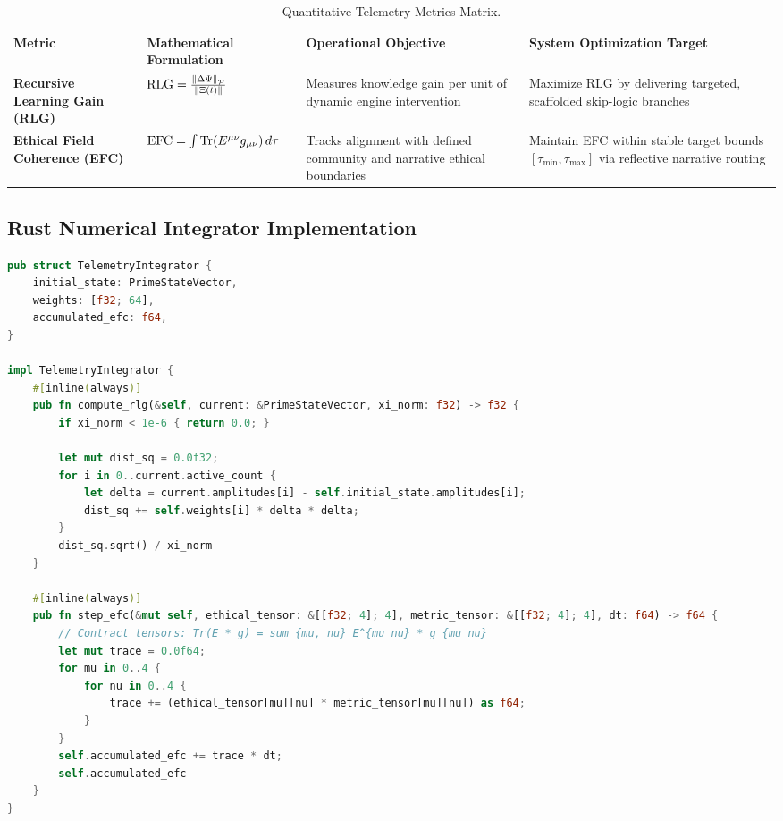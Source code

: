 \begin{table}[htbp]
\centering
\small
\begin{tabularx}{\textwidth}{l p{3.8cm} p{3.8cm} X}
\toprule
\textbf{Metric} & \textbf{Mathematical Formulation} & \textbf{Operational Objective} & \textbf{System Optimization Target} \\
\midrule
\textbf{Recursive Learning Gain (RLG)} & $\mathrm{RLG} = \frac{\norm{\Delta \Psi}_{\mathcal{P}}}{\norm{\Xi(t)}}$ & Measures knowledge gain per unit of dynamic engine intervention & Maximize RLG by delivering targeted, scaffolded skip-logic branches \\
\addlinespace
\textbf{Ethical Field Coherence (EFC)} & $\mathrm{EFC} = \int \Tr(E^{\mu\nu} g_{\mu\nu})\, d\tau$ & Tracks alignment with defined community and narrative ethical boundaries & Maintain EFC within stable target bounds $[\tau_{\min}, \tau_{\max}]$ via reflective narrative routing \\
\bottomrule
\end{tabularx}
\caption{Quantitative Telemetry Metrics Matrix.}
\label{tab:telemetry_metrics}
\end{table}

\subsection{Rust Numerical Integrator Implementation}

\begin{lstlisting}[language=Rust, caption={SIMD-Accelerated RLG and EFC Metric Integrators}]
pub struct TelemetryIntegrator {
    initial_state: PrimeStateVector,
    weights: [f32; 64],
    accumulated_efc: f64,
}

impl TelemetryIntegrator {
    #[inline(always)]
    pub fn compute_rlg(&self, current: &PrimeStateVector, xi_norm: f32) -> f32 {
        if xi_norm < 1e-6 { return 0.0; }
        
        let mut dist_sq = 0.0f32;
        for i in 0..current.active_count {
            let delta = current.amplitudes[i] - self.initial_state.amplitudes[i];
            dist_sq += self.weights[i] * delta * delta;
        }
        dist_sq.sqrt() / xi_norm
    }

    #[inline(always)]
    pub fn step_efc(&mut self, ethical_tensor: &[[f32; 4]; 4], metric_tensor: &[[f32; 4]; 4], dt: f64) -> f64 {
        // Contract tensors: Tr(E * g) = sum_{mu, nu} E^{mu nu} * g_{mu nu}
        let mut trace = 0.0f64;
        for mu in 0..4 {
            for nu in 0..4 {
                trace += (ethical_tensor[mu][nu] * metric_tensor[mu][nu]) as f64;
            }
        }
        self.accumulated_efc += trace * dt;
        self.accumulated_efc
    }
}
\end{lstlisting}

